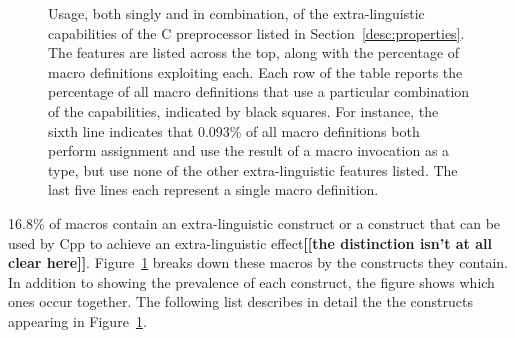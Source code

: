\documentclass[10pt]{article}
\newcommand{\comment}[1]{\textbf{[[#1]]}}
\newcommand{\captionsmall}[1]{\caption[]{\small #1}}
\begin{document}
\begin{figure}
  {\small\centerline{}}
  
  \captionsmall{Usage, both singly and in
    combination, of the extra-linguistic capabilities of the C
    preprocessor listed in Section~\ref{desc:properties}.  The features are
    listed across the top, along with the percentage of macro definitions
    exploiting each.  Each row of the table reports the percentage of all
    macro definitions that use a particular combination of the
    capabilities, indicated by black squares.  For instance, the sixth
    line indicates that 0.093\% of all
    macro definitions both perform assignment and use the result of a macro
    invocation as a type, but use none of the other extra-linguistic
    features listed.  The last five lines each represent a single macro
    definition.}
  \label{fig:subset-properties}
\end{figure}

16.8\% of macros contain an extra-linguistic construct or a
construct that can be used by Cpp to achieve an extra-linguistic
effect\comment{the distinction isn't at all clear here}.
Figure~\ref{fig:subset-properties} breaks down these macros by the
constructs they contain.  In addition to showing the prevalence of each
construct, the figure shows which ones occur together.  The following list
describes in detail the the constructs appearing in
Figure~\ref{fig:subset-properties}.


\label{desc:properties}
\end{document}
